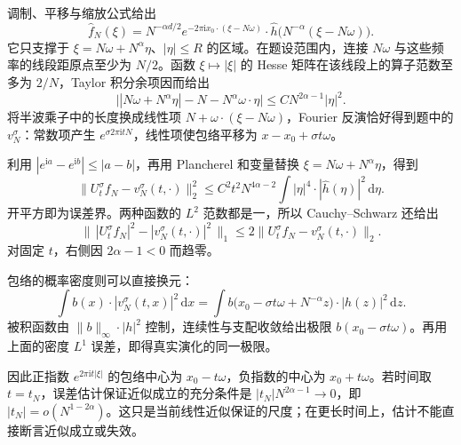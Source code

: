 \begin{solution}
调制、平移与缩放公式给出
\[
 \widehat f_N(\xi)
 =N^{-\alpha d/2}e^{-2\pi\mathrm ix_0\cdot(\xi-N\omega)}
                \cdot\widehat h\bigl(N^{-\alpha}(\xi-N\omega)\bigr).
\]
它只支撑于 \(\xi=N\omega+N^\alpha\eta\)、\(|\eta|\leq R\) 的区域。在题设范围内，连接 \(N\omega\) 与这些频率的线段距原点至少为 \(N/2\)。函数 \(\xi\mapsto|\xi|\) 的 Hesse 矩阵在该线段上的算子范数至多为 \(2/N\)，Taylor 积分余项因而给出
\[
 \bigl||N\omega+N^\alpha\eta|-N-N^\alpha\omega\cdot\eta\bigr|
       \leq C N^{2\alpha-1}|\eta|^2.
\]
将半波乘子中的长度换成线性项
\(N+\omega\cdot(\xi-N\omega)\)，Fourier 反演恰好得到题中的 \(v_N^\sigma\)：常数项产生 \(e^{\sigma2\pi\mathrm itN}\)，线性项使包络平移为 \(x-x_0+\sigma t\omega\)。

利用 \(|e^{\mathrm ia}-e^{\mathrm ib}|\leq|a-b|\)，再用 Plancherel 和变量替换 \(\xi=N\omega+N^\alpha\eta\)，得到
\[
 \|U_t^\sigma f_N-v_N^\sigma(t,\cdot)\|_2^2
 \leq C^2t^2N^{4\alpha-2}
       \int|\eta|^4\cdot|\widehat h(\eta)|^2\,\mathrm d\eta.
\]
开平方即为误差界。两种函数的 \(L^2\) 范数都是一，所以 Cauchy--Schwarz 还给出
\[
 \bigl\|\,|U_t^\sigma f_N|^2-|v_N^\sigma(t,\cdot)|^2\,\bigr\|_1
       \leq2\|U_t^\sigma f_N-v_N^\sigma(t,\cdot)\|_2.
\]
对固定 \(t\)，右侧因 \(2\alpha-1<0\) 而趋零。

包络的概率密度则可以直接换元：
\[
 \int b(x)\cdot|v_N^\sigma(t,x)|^2\,\mathrm dx
 =\int b\bigl(x_0-\sigma t\omega+N^{-\alpha}z\bigr)
                                      \cdot|h(z)|^2\,\mathrm dz.
\]
被积函数由 \(\|b\|_\infty\cdot|h|^2\) 控制，连续性与支配收敛给出极限 \(b(x_0-\sigma t\omega)\)。再用上面的密度 \(L^1\) 误差，即得真实演化的同一极限。

因此正指数 \(e^{2\pi\mathrm it|\xi|}\) 的包络中心为 \(x_0-t\omega\)，负指数的中心为 \(x_0+t\omega\)。若时间取 \(t=t_N\)，误差估计保证近似成立的充分条件是
\(|t_N|N^{2\alpha-1}\to0\)，即 \(|t_N|=o(N^{1-2\alpha})\)。这只是当前线性近似保证的尺度；在更长时间上，估计不能直接断言近似成立或失效。
\end{solution}
